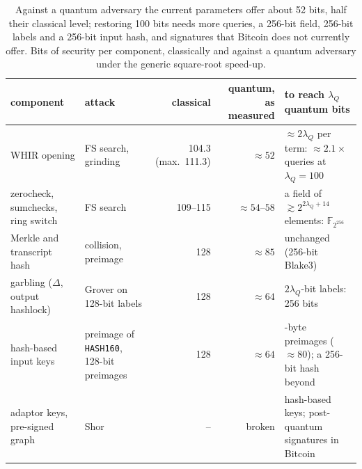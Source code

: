 \documentclass[11pt]{article}
\begin{document}
\begin{table}[t]\centering\footnotesize\setlength{\tabcolsep}{4pt}
\begin{tabularx}{\textwidth}{>{\raggedright\arraybackslash}p{2.6cm}>{\raggedright\arraybackslash}p{2.4cm}rr>{\raggedright\arraybackslash}X}\toprule
component & attack & classical & quantum, as measured & to reach $\lambda_Q$ quantum bits\\\midrule
WHIR opening & FS search, grinding & 104.3 (max.\ 111.3) & $\approx52$ & $\approx2\lambda_Q$ per term: $\approx2.1\times$ queries at $\lambda_Q=100$\\
zerocheck, sumchecks, ring switch & FS search & 109--115 & $\approx54$--$58$ & a field of $\gtrsim2^{2\lambda_Q+14}$ elements: $\mathbb{F}_{2^{256}}$\\
Merkle and transcript hash & collision, preimage & 128 & $\approx85$ & unchanged (256-bit Blake3)\\
garbling ($\Delta$, output hashlock) & Grover on 128-bit labels & 128 & $\approx64$ & $2\lambda_Q$-bit labels: 256 bits\\
hash-based input keys & preimage of \texttt{HASH160}, 128-bit preimages & 128 & $\approx64$ & 20-byte preimages ($\approx80$); a 256-bit hash beyond\\
adaptor keys, pre-signed graph & Shor & -- & broken & hash-based keys; post-quantum signatures in Bitcoin\\\bottomrule
\end{tabularx}
\caption{Against a quantum adversary the current parameters offer about 52 bits,
half their classical level; restoring 100 bits needs more queries, a 256-bit field,
256-bit labels and a 256-bit input hash, and signatures that Bitcoin does not
currently offer. Bits of security per component, classically and against a
quantum adversary under the generic square-root speed-up.}
\label{tab:pq}
\end{table}
\end{document}
